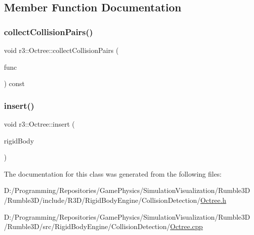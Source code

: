 \subsection{Member Function Documentation}
\mbox{\label{classr3_1_1_octree_aca2c5fa53dc0c7f6b3f9b97e7e6c2375}} 
\subsubsection{\texorpdfstring{collect\+Collision\+Pairs()}{collectCollisionPairs()}}
{\footnotesize\ttfamily void r3\+::\+Octree\+::collect\+Collision\+Pairs (\begin{DoxyParamCaption}\item[{const \mbox{\hyperlink{classr3_1_1_octree_a39df948aedb55b9aaea780e7c6790bbd}{Insert\+Function}} \&}]{func }\end{DoxyParamCaption}) const}

\mbox{\label{classr3_1_1_octree_a846b91cbb3ce3a66a61a857dca3c266c}} 
\subsubsection{\texorpdfstring{insert()}{insert()}}
{\footnotesize\ttfamily void r3\+::\+Octree\+::insert (\begin{DoxyParamCaption}\item[{\mbox{\hyperlink{classr3_1_1_rigid_body}{Rigid\+Body}} $\ast$}]{rigid\+Body }\end{DoxyParamCaption})}



The documentation for this class was generated from the following files\+:\begin{DoxyCompactItemize}
\item 
D\+:/\+Programming/\+Repositories/\+Game\+Physics/\+Simulation\+Visualization/\+Rumble3\+D/\+Rumble3\+D/include/\+R3\+D/\+Rigid\+Body\+Engine/\+Collision\+Detection/\mbox{\hyperlink{_octree_8h}{Octree.\+h}}\item 
D\+:/\+Programming/\+Repositories/\+Game\+Physics/\+Simulation\+Visualization/\+Rumble3\+D/\+Rumble3\+D/src/\+Rigid\+Body\+Engine/\+Collision\+Detection/\mbox{\hyperlink{_octree_8cpp}{Octree.\+cpp}}\end{DoxyCompactItemize}
